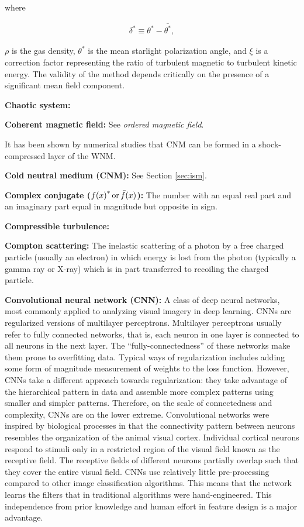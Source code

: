 \documentclass[a4paper,10pt]{article}
\begin{document}
{\noindent}where

\begin{align*}
    \delta^* \equiv \theta^* - \bar{\theta^*},
\end{align*}

{\noindent}$\rho$ is the gas density, $\theta^*$ is the mean starlight polarization angle, and $\xi$ is a correction factor representing the ratio of turbulent magnetic to turbulent kinetic energy. The validity of the method depends critically on the presence of a significant mean field component.

{\noindent}\textbf{Chaotic system:}

{\noindent}\textbf{Coherent magnetic field:} See \textit{ordered magnetic field}.

{\noindent}It has been shown by numerical studies that CNM can be formed in a shock-compressed layer of the WNM.

{\noindent}\textbf{Cold neutral medium (CNM):} See Section \ref{sec:ism}.

{\noindent}\textbf{Complex conjugate (${f(x)}^*\,{\rm or}\,\bar{f}(x)$):} The number with an equal real part and an imaginary part equal in magnitude but opposite in sign.

{\noindent}\textbf{Compressible turbulence:}

{\noindent}\textbf{Compton scattering:} The inelastic scattering of a photon by a free charged particle (usually an electron) in which energy is lost from the photon (typically a gamma ray or X-ray) which is in part transferred to recoiling the charged particle.

{\noindent}\textbf{Convolutional neural network (CNN):} A class of deep neural networks, most commonly applied to analyzing visual imagery in deep learning. CNNs are regularized versions of multilayer perceptrons. Multilayer perceptrons usually refer to fully connected networks, that is, each neuron in one layer is connected to all neurons in the next layer. The ``fully-connectedness'' of these networks make them prone to overfitting data. Typical ways of regularization includes adding some form of magnitude measurement of weights to the loss function. However, CNNs take a different approach towards regularization: they take advantage of the hierarchical pattern in data and assemble more complex patterns using smaller and simpler patterns. Therefore, on the scale of connectedness and complexity, CNNs are on the lower extreme. Convolutional networks were inspired by biological processes in that the connectivity pattern between neurons resembles the organization of the animal visual cortex. Individual cortical neurons respond to stimuli only in a restricted region of the visual field known as the receptive field. The receptive fields of different neurons partially overlap such that they cover the entire visual field. CNNs use relatively little pre-processing compared to other image classification algorithms. This means that the network learns the filters that in traditional algorithms were hand-engineered. This independence from prior knowledge and human effort in feature design is a major advantage.
\end{document}
